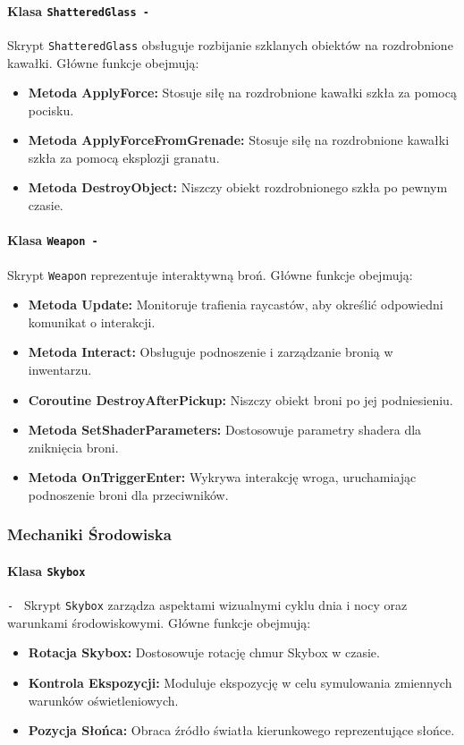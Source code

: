 \paragraph{Klasa \texttt{ShatteredGlass -}}
Skrypt \texttt{ShatteredGlass} obsługuje rozbijanie szklanych obiektów na rozdrobnione kawałki. Główne funkcje obejmują:
\begin{itemize}
  \item \textbf{Metoda ApplyForce:} Stosuje siłę na rozdrobnione kawałki szkła za pomocą pocisku.
  \item \textbf{Metoda ApplyForceFromGrenade:} Stosuje siłę na rozdrobnione kawałki szkła za pomocą eksplozji granatu.
  \item \textbf{Metoda DestroyObject:} Niszczy obiekt rozdrobnionego szkła po pewnym czasie.
\end{itemize}

\paragraph{Klasa \texttt{Weapon -}}
Skrypt \texttt{Weapon} reprezentuje interaktywną broń. Główne funkcje obejmują:
\begin{itemize}
  \item \textbf{Metoda Update:} Monitoruje trafienia raycastów, aby określić odpowiedni komunikat o interakcji.
  \item \textbf{Metoda Interact:} Obsługuje podnoszenie i zarządzanie bronią w inwentarzu.
  \item \textbf{Coroutine DestroyAfterPickup:} Niszczy obiekt broni po jej podniesieniu.
  \item \textbf{Metoda SetShaderParameters:} Dostosowuje parametry shadera dla zniknięcia broni.
  \item \textbf{Metoda OnTriggerEnter:} Wykrywa interakcję wroga, uruchamiając podnoszenie broni dla przeciwników.
\end{itemize}

\subsubsection{Mechaniki Środowiska}

\paragraph{Klasa \texttt{Skybox}} \label{subsubsec:skybox}
\texttt{- } Skrypt \texttt{Skybox} zarządza aspektami wizualnymi cyklu dnia i nocy oraz warunkami środowiskowymi. Główne funkcje obejmują:
\begin{itemize}
  \item \textbf{Rotacja Skybox:} Dostosowuje rotację chmur Skybox w czasie.
  \item \textbf{Kontrola Ekspozycji:} Moduluje ekspozycję w celu symulowania zmiennych warunków oświetleniowych.
  \item \textbf{Pozycja Słońca:} Obraca źródło światła kierunkowego reprezentujące słońce.
\end{itemize}

